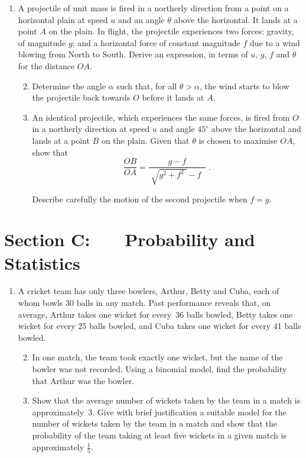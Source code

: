 \documentclass[a4, 11pt]{report}
\newlength{\qspace}
\newcounter{qnumber}
\newenvironment{question}%
 {\vspace{\qspace}
  \begin{enumerate}[\bfseries 1\quad][10]%
    \setcounter{enumi}{\value{qnumber}}%
    \item%
 }
{
  \end{enumerate}
  \filbreak
  \stepcounter{qnumber}
 }
\newenvironment{questionparts}[1][1]%
 {
  \begin{enumerate}[\bfseries (i)]%
    \setcounter{enumii}{#1}
    \addtocounter{enumii}{-1}
    \setlength{\itemsep}{5mm}
    \setlength{\parskip}{8pt}
 }
 {
  \end{enumerate}
 }
\def\e{{\mathrm e}}
\begin{document}

\begin{question}
A projectile of unit mass
is fired in a northerly direction
from a point on a horizontal plain at speed $u$ and an angle 
$\theta$ above the horizontal.  It lands at a point $A$ on the plain.
In flight, the 
projectile experiences two forces: 
gravity, of magnitude $g$; and 
a horizontal force of
constant magnitude $f$ due to a wind blowing from North to South. Derive an
expression, in terms of $u$, $g$, $f$ and $\theta$ for the distance $OA$.

\begin{questionparts} 
\item Determine the angle $\alpha$ such that, for all $\theta>\alpha$,
the wind starts to blow the projectile back towards $O$ before it 
lands at $A$.
\item An identical projectile, which experiences the same forces,
 is fired from $O$ in a northerly direction
at speed $u$ and angle $45^\circ$ above the 
horizontal and lands at a point $B$ on the plain. Given that $\theta$ is
chosen to maximise $OA$, show that 
\[
\frac{OB}{OA} = \frac{ g-f}{\; \sqrt{g^2+f^2\;}- f \;\;}\;.
\]

Describe carefully the motion of the second  projectile when $f=g$.
\end{questionparts}
\end{question}
	

	
	\newpage
\section*{Section C: \ \ \ Probability and Statistics}


\begin{question}
A cricket team has only three bowlers, Arthur, Betty and 
Cuba, each of whom bowls 30
balls in any match. Past performance reveals that, on average, 
 Arthur  takes one wicket for every~36 balls bowled, 
Betty  takes one wicket for every 25 balls bowled,
and Cuba  takes one wicket for every 41 balls bowled.

\begin{questionparts}
\item In one match, the team took exactly one wicket, but 
the name of the bowler was
not recorded. Using a binomial model,
find the probability that
 Arthur  was the bowler.
\item Show that the  average 
number of wickets taken by the team in a match is approximately~3.
Give  with brief justification a suitable model for the number of
wickets taken by the team in a match and show that  
the probability of the team taking at least five wickets in a given match
is approximately $\frac15$. 

\noindent[You may use the approximation $\e^3 = 20$.]
\end{questionparts}
\end{question}
\end{document}
